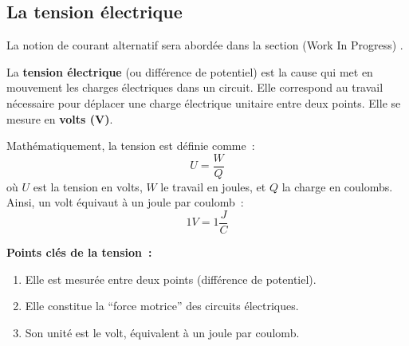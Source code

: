 \subsection{La tension \'electrique}
\begin{Note}
	La notion de courant alternatif sera abord\'ee dans la section (Work In Progress) .
\end{Note}
La \textbf{tension \'electrique} (ou diff\'erence de potentiel) est la cause qui met en mouvement les charges \'electriques dans un circuit. Elle correspond au travail n\'ecessaire pour d\'eplacer une charge \'electrique unitaire entre deux points. Elle se mesure en \textbf{volts (\unit{\volt})}.\par
Math\'ematiquement, la tension est d\'efinie comme~:
\[
  U = \frac{W}{Q}
\]
où \(U\) est la tension en volts, \(W\) le travail en joules, et \(Q\) la charge en coulombs. Ainsi, un volt \'equivaut à un joule par coulomb~:
\[
1V=1\frac{J}{C}
\]
\vspace{\baselineskip}
\begin{Note}
\textbf{Points cl\'es de la tension~:}
\begin{enumerate}
  \item Elle est mesur\'ee entre deux points (diff\'erence de potentiel).
  \item Elle constitue la “force motrice” des circuits \'electriques.
  \item Son unit\'e est le volt, \'equivalent à un joule par coulomb.
\end{enumerate}
\end{Note}

